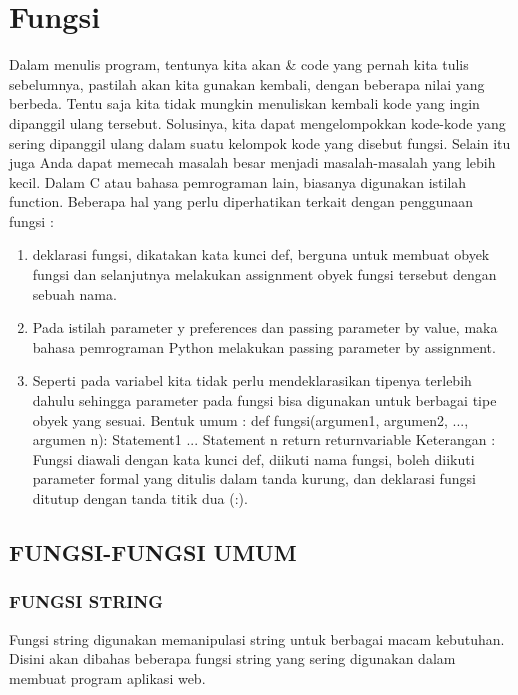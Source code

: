 \section{Fungsi}
Dalam menulis program, tentunya kita akan \& code yang pernah kita tulis sebelumnya, pastilah akan kita gunakan kembali, dengan beberapa
nilai yang berbeda. Tentu saja kita tidak mungkin menuliskan kembali kode yang ingin dipanggil ulang tersebut. 
Solusinya, kita dapat mengelompokkan kode-kode yang sering dipanggil ulang dalam suatu kelompok kode yang disebut fungsi. 
Selain itu juga Anda dapat memecah masalah besar menjadi masalah-masalah yang lebih kecil. Dalam C atau bahasa pemrograman lain, 
biasanya digunakan istilah function. 
Beberapa hal yang perlu diperhatikan terkait dengan penggunaan fungsi : 
\begin{enumerate}
\item
deklarasi fungsi, dikatakan kata kunci def, berguna untuk membuat obyek fungsi dan selanjutnya melakukan assignment obyek fungsi
tersebut dengan sebuah nama.
\item
Pada istilah parameter y preferences dan passing parameter by value, maka bahasa pemrograman Python melakukan passing parameter
by assignment.
\item
Seperti pada variabel kita tidak perlu mendeklarasikan tipenya terlebih dahulu sehingga parameter pada fungsi bisa digunakan untuk 
berbagai tipe obyek yang sesuai.
Bentuk umum :
def fungsi(argumen1, argumen2, ..., argumen n):
 Statement1
 ...
 Statement n
 return returnvariable
Keterangan :
Fungsi diawali dengan kata kunci def, diikuti
nama fungsi, boleh diikuti parameter formal yang
ditulis dalam tanda kurung, dan deklarasi fungsi ditutup dengan tanda titik dua (:).
\end{enumerate}
 

\subsection{FUNGSI-FUNGSI UMUM}
\subsubsection{FUNGSI STRING}
Fungsi string digunakan memanipulasi string untuk berbagai macam kebutuhan. Disini
akan dibahas beberapa fungsi string yang sering digunakan dalam membuat program
aplikasi web.
